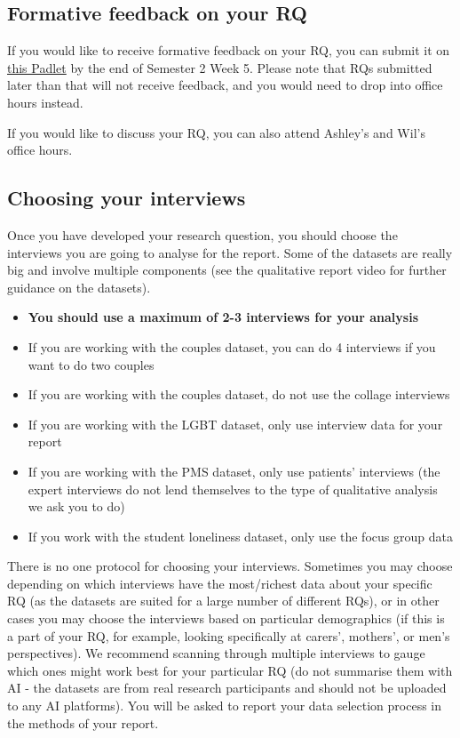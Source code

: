 \documentclass[
  english,
  letterpaper,
  DIV=11,
  numbers=noendperiod]{scrreprt}
\providecommand{\tightlist}{%
  \setlength{\itemsep}{0pt}\setlength{\parskip}{0pt}}
\begin{document}
\subsection{Formative feedback on your
RQ}\label{formative-feedback-on-your-rq}

If you would like to receive formative feedback on your RQ, you can
submit it on
\href{https://padlet.com/wilhelmiinatoivo/rm2-odl-research-questions-f844153314j3pwr2}{this
Padlet} by the end of Semester 2 Week 5. Please note that RQs submitted
later than that will not receive feedback, and you would need to drop
into office hours instead.

If you would like to discuss your RQ, you can also attend Ashley's and
Wil's office hours.

\subsection{Choosing your interviews}\label{choosing-your-interviews}

Once you have developed your research question, you should choose the
interviews you are going to analyse for the report. Some of the datasets
are really big and involve multiple components (see the qualitative
report video for further guidance on the datasets).

\begin{itemize}
\tightlist
\item
  \textbf{You should use a maximum of 2-3 interviews for your analysis}
\item
  If you are working with the couples dataset, you can do 4 interviews
  if you want to do two couples
\item
  If you are working with the couples dataset, do not use the collage
  interviews
\item
  If you are working with the LGBT dataset, only use interview data for
  your report
\item
  If you are working with the PMS dataset, only use patients' interviews
  (the expert interviews do not lend themselves to the type of
  qualitative analysis we ask you to do)
\item
  If you work with the student loneliness dataset, only use the focus
  group data
\end{itemize}

There is no one protocol for choosing your interviews. Sometimes you may
choose depending on which interviews have the most/richest data about
your specific RQ (as the datasets are suited for a large number of
different RQs), or in other cases you may choose the interviews based on
particular demographics (if this is a part of your RQ, for example,
looking specifically at carers', mothers', or men's perspectives). We
recommend scanning through multiple interviews to gauge which ones might
work best for your particular RQ (do not summarise them with AI - the
datasets are from real research participants and should not be uploaded
to any AI platforms). You will be asked to report your data selection
process in the methods of your report.
\end{document}
